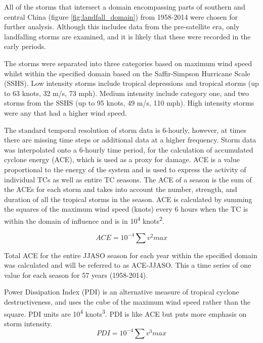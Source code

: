 All of the storms that intersect a domain encompassing parts of southern and central China (figure \ref{fig:landfall_domain}) from 1958-2014 were chosen for further analysis. Although this includes data from the pre-satellite era, only landfalling storms are examined, and it is likely that these were recorded in the early periods.

The storms were separated into three categories based on maximum wind speed whilst within the specified domain based on the Saffir-Simpson Hurricane Scale (SSHS). Low intensity storms include tropical depressions and tropical storms (up to 63 knots, 32 m/s, 73 mph). Medium intensity include category one, and two storms from the SSHS (up to 95 knots, 49 m/s, 110 mph). High intensity storms were any that had a higher wind speed.

The standard temporal resolution of storm data is 6-hourly, however, at times there are missing time steps or additional data at a higher frequency. Storm data was interpolated onto a 6-hourly time period, for the calculation of accumulated cyclone energy (ACE), which is used as a proxy for damage. ACE is a value proportional to the energy of the system and is used to express the activity of individual TCs as well as entire TC seasons. The ACE of a season is the sum of the ACEs for each storm and takes into account the number, strength, and duration of all the tropical storms in the season. ACE is calculated by summing the squares of the maximum wind speed (knots) every 6 hours when the TC is within the domain of influence and is in 10\textsuperscript{4} knots\textsuperscript{2}. 


\begin{equation}
ACE = 10^{-4}	 \sum v^2max
\end{equation}

Total ACE for the entire JJASO season for each year within the specified domain was calculated and will be referred to as ACE-JJASO. This a time series of one value for each season for 57 years (1958-2014).

Power Dissipation Index (PDI) is an alternative measure of tropical cyclone destructiveness, and uses the cube of the maximum wind speed rather than the square. PDI units are 10\textsuperscript{4} knots\textsuperscript{3}. PDI is like ACE but puts more emphasis on storm intensity.
\begin{equation}
PDI = 10^{-4}	 \sum v^3max
\end{equation} 	 


